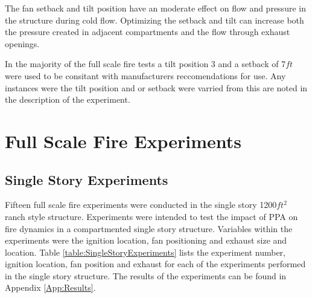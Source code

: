 \documentclass{article}
\begin{document}
The fan setback and tilt position have an moderate effect on flow and pressure in the structure during cold flow. Optimizing the setback and tilt can increase both the pressure created in adjacent compartments and the flow through exhaust openings. 

In the majority of the full scale fire tests a tilt position 3 and a setback of 7$ft$ were used to be consitant with manufacturers reccomendations for use. Any instances were the tilt position and or setback were varried from this are noted in the description of the experiment. 

\clearpage

\section{Full Scale Fire Experiments}

\subsection{Single Story Experiments} \label{SingleStoryExp}

Fifteen full scale fire experiments were conducted in the single story 1200$ft^2$ ranch style structure. Experiments were intended to test the impact of PPA on fire dynamics in a compartmented single story structure. Variables within the experiments were the ignition location, fan positioning and exhaust size and location. Table \ref{table:SingleStoryExperiments} lists the experiment number, ignition location, fan position and exhaust for each of the experiments performed in the single story structure. The results of the experiments can be found in Appendix \ref{App:Results}.

\mbox{}
\end{document}
